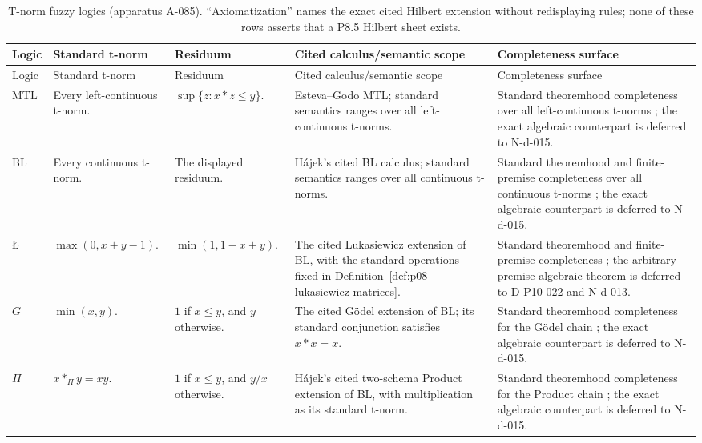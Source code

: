 \begin{landscape}
\begin{longtable}{@{}p{.10\linewidth}p{.18\linewidth}p{.20\linewidth}p{.20\linewidth}p{.23\linewidth}@{}}
\caption{T-norm fuzzy logics (apparatus A-085).  ``Axiomatization'' names the
exact cited Hilbert extension without redisplaying rules; none of these rows
asserts that a P8.5 Hilbert sheet exists.}
\label{tab:p08-tnorm-logics}\\
\toprule
Logic & Standard t-norm & Residuum & Cited calculus/semantic scope & Completeness surface \\
\midrule
\endfirsthead
\toprule
Logic & Standard t-norm & Residuum & Cited calculus/semantic scope & Completeness surface \\
\midrule
\endhead
\(\mathrm{MTL}\) & Every left-continuous t-norm. &
\(\sup\{z:x\ast z\leq y\}\). & Esteva--Godo MTL; standard semantics ranges
over all left-continuous t-norms. & Standard theoremhood completeness over all
left-continuous t-norms \cite{EstevaGodo2001,JeneiMontagna2002}; the exact
algebraic counterpart is deferred to N-d-015. \\
\addlinespace
\(\mathrm{BL}\) & Every continuous t-norm. & The displayed residuum. &
H\'ajek's cited BL calculus; standard semantics ranges over all continuous
t-norms. & Standard theoremhood and finite-premise completeness
over all continuous t-norms \cite{CignoliEstevaGodoTorrens2000}; the exact
algebraic counterpart is deferred to N-d-015. \\
\addlinespace
\(\text{\L}\) & \(\max(0,x+y-1)\). &
\(\min(1,1-x+y)\). & The cited Lukasiewicz extension of BL, with the standard
operations fixed in Definition~\ref{def:p08-lukasiewicz-matrices}. & Standard
theoremhood and finite-premise completeness
\cite{Hajek1998,CignoliDOttavianoMundici2000}; the arbitrary-premise algebraic
theorem is deferred to D-P10-022 and N-d-013. \\
\addlinespace
\(G\) & \(\min(x,y)\). & \(1\) if \(x\leq y\), and
\(y\) otherwise. & The cited G\"odel extension of BL; its standard conjunction
satisfies \(x\ast x=x\). & Standard theoremhood completeness for the
G\"odel chain \cite{Hajek1998}; the exact algebraic counterpart is deferred
to N-d-015. \\
\addlinespace
\(\Pi\) & \(x\mathbin{\ast_{\Pi}}y=xy\). & \(1\) if \(x\leq y\), and \(y/x\) otherwise.
& H\'ajek's cited two-schema Product extension of BL, with multiplication as
its standard t-norm. & Standard theoremhood completeness for the Product chain
\cite{Hajek1998}; the exact algebraic counterpart is deferred to N-d-015. \\
\bottomrule
\end{longtable}
\end{landscape}

